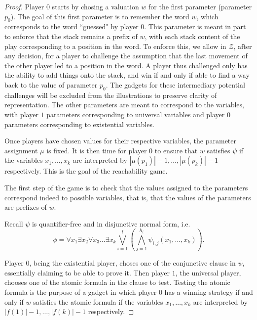 \documentclass[a4paper,UKenglish,cleveref, autoref, thm-restate]{lipics-v2021}
\renewcommand{\C}{\mathcal{C}}
\begin{document}
{\begin{proof}
Player $0$ starts by chosing a valuation $w$ for the first parameter (parameter $p_0$). The goal of this first parameter is to remember
the word $w$, which corresponds to the word ``guessed" by player $0$. 
This parameter is meant in part to enforce that 
the stack remains a prefix of $w$, with each stack content of the play corresponding to a position in the word.
 To enforce this, we allow in $\mathcal{Z}$, after any decision, for a player to challenge the assumption that the last movement of the other player led to a position in the word.
  A player thus challenged only has the ability to add things onto the stack, and win if and only if able to find a way back to the value of parameter $p_0$. 
 The gadgets for these intermediary potential challenges will be excluded from the illustrations to preserve clarity of representation.
The other parameters are meant to correspond to the variables, with player $1$ parameters corresponding to universal variables and player $0$ parameters corresponding to existential variables.

Once players have chosen values for their respective variables, the parameter assignment
$\mu$ is fixed. It is then time
for player $0$ to ensure that
$w$
satisfies $\psi$ if the variables $x_1, \ldots, x_k$ are interpreted by 
$ |\mu(p_1)|-1, \ldots, |\mu(p_k)|-1$ respectively. This is the goal of the reachability game.



The first step of the game is to check that the values assigned to the parameters correspond indeed to possible variables, that is, that the values of the parameters are prefixes of $w$. 

Recall $\psi$ is quantifier-free and in disjunctive normal form, i.e.
 $$\phi = \forall x_1 \exists x_2 \forall x_3 \ldots \exists x_k \bigvee_{i=1}^l(\bigwedge_{j=1}^{h_i} \psi_{i,j}(x_1, \ldots, x_k)).$$


Player $0$, being the existential player, choses one of the conjunctive clause in $\psi$, essentially claiming to be able to prove it. Then player $1$, the universal player, chooses one of the atomic formula in the clause to test. 
Testing the atomic formula is the purpose of a gadget 
in which
 player $0$ has a winning strategy 
  if and only if 
$w$ satisfies %
the atomic formula
 if the variables $x_1, \ldots, x_k$ are interpreted by 
$ |f(1)|-1, \ldots, |f(k)|-1$ respectively.



\end{proof}}
\end{document}
